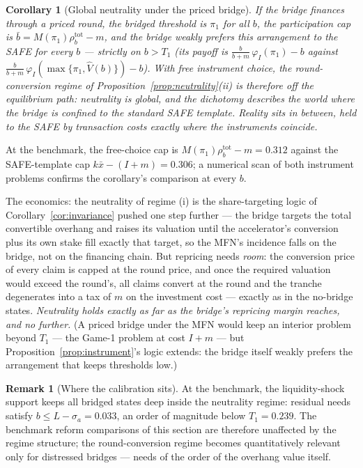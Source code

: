 \documentclass[11pt]{article}
\newtheorem{corollary}{Corollary}
\theoremstyle{definition}
\newtheorem{remark}{Remark}
\begin{document}
\begin{corollary}[Global neutrality under the priced bridge]\label{cor:pricedmfn}
If the bridge finances through a priced round, the bridged threshold is $\pi_1$ for all $b$, the participation cap is $\bar b=M(\pi_1)\rho_b^{\mathrm{tot}}-m$, and the bridge weakly prefers this arrangement to the SAFE for every $b$ --- strictly on $b>T_1$ (its payoff is $\tfrac{b}{b+m}\,\varphi_I(\pi_1)-b$ against $\tfrac{b}{b+m}\,\varphi_I(\max\{\pi_1,\hat V(b)\})-b$). With free instrument choice, the round-conversion regime of Proposition~\ref{prop:neutrality}(ii) is therefore \emph{off the equilibrium path}: neutrality is global, and the dichotomy describes the world where the bridge is confined to the standard SAFE template. Reality sits in between, held to the SAFE by transaction costs exactly where the instruments coincide.
\end{corollary}

At the benchmark, the free-choice cap is $M(\pi_1)\rho_b^{\mathrm{tot}}-m=0.312$ against the SAFE-template cap $k\bar x-(I+m)=0.306$; a numerical scan of both instrument problems confirms the corollary's comparison at every $b$.

The economics: the neutrality of regime (i) is the share-targeting logic of Corollary~\ref{cor:invariance} pushed one step further --- the bridge targets the total convertible overhang and raises its valuation until the accelerator's conversion plus its own stake fill exactly that target, so the MFN's incidence falls on the bridge, not on the financing chain. But repricing needs \emph{room}: the conversion price of every claim is capped at the round price, and once the required valuation would exceed the round's, all claims convert at the round and the tranche degenerates into a tax of $m$ on the investment cost --- exactly as in the no-bridge states. \emph{Neutrality holds exactly as far as the bridge's repricing margin reaches, and no further.} (A priced bridge under the MFN would keep an interior problem beyond $T_1$ --- the Game-1 problem at cost $I+m$ --- but Proposition~\ref{prop:instrument}'s logic extends: the bridge itself weakly prefers the arrangement that keeps thresholds low.)

\begin{remark}[Where the calibration sits]\label{rem:calibrationregime}
At the benchmark, the liquidity-shock support keeps all bridged states deep inside the neutrality regime: residual needs satisfy $b\le L-\sigma_a=0.033$, an order of magnitude below $T_1=0.239$. The benchmark reform comparisons of this section are therefore unaffected by the regime structure; the round-conversion regime becomes quantitatively relevant only for distressed bridges --- needs of the order of the overhang value itself.
\end{remark}
\end{document}
